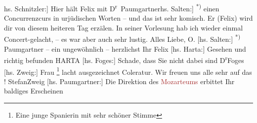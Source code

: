{\bigskip}
\pstart
           \noindent{}{\pb}{[}hs. Schnitzler:{]} Hier hält Felix mit D\textsuperscript{r} Paumgartner\introOben{}{[}hs. Salten:{]} \textsuperscript{*)}\introOben{} einen Concurrenzcurs in urjüdischen Worten – und das ist sehr komisch. Er
               (Felix) wird dir von diesem heiteren Tag erzälen. In seiner Vorlesung hab ich wieder
               einmal Concert-gelacht, – es war aber auch sehr lustig. Alles Liebe,\pend
           \pstart \spacefill\mbox{O.}\pend{}{\vspace{1\baselineskip}}
\pstart
           {[}hs. Salten:{]} \textsuperscript{*)} Paumgartner – ein ungewöhnlich \label{K_L03678-1v}\label{K_L03678-1h}{ }\label{K_L03678-2v}\label{K_L03678-2h} – \pend
           \pstart herzlichst Ihr \spacefill\mbox{Felix}\pend{}{\vspace{1\baselineskip}}
\pstart
           {[}hs. Harta:{]} Gesehen und richtig befunden\pend
           \pstart \spacefill\mbox{HARTA}\pend{}{\vspace{1\baselineskip}}
\pstart
           {[}hs. Foges:{]} Schade, dass Sie nicht dabei sind\pend
           \pstart \spacefill\mbox{D\textsuperscript{r}Foges}\pend{}{\vspace{1\baselineskip}}
\pstart
           {[}hs. Zweig:{]} Frau \label{K_L03678-3v}\label{K_L03678-3h}\footnote{\noindent{}Eine junge Spanierin mit sehr schöner Stimme} lacht ausgezeichnet Coleratur. Wir freuen uns alle sehr auf das \label{K_L03678-4v}\label{K_L03678-4h}!\pend
           \pstart \spacefill\mbox{StefanZweig}\pend{}{\vspace{1\baselineskip}}
\pstart
           {[}hs. Paumgartner:{]} Die Direktion des \textcolor{brown}{Mozarteums}{}\ledrightnote{\textcolor{brown}{Mozarteum [Salzburg]}} erbittet Ihr baldiges Erscheinen\pend
           
